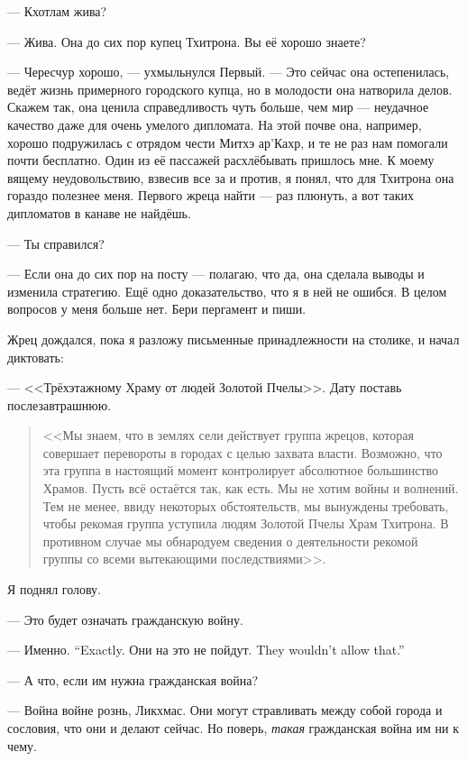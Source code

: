 --- Кхотлам жива?

--- Жива.
Она до сих пор купец Тхитрона.
Вы её хорошо знаете?

--- Чересчур хорошо, --- ухмыльнулся Первый.
--- Это сейчас она остепенилась, ведёт жизнь примерного городского купца, но в молодости она натворила делов.
Скажем так, она ценила справедливость чуть больше, чем мир --- неудачное качество даже для очень умелого дипломата.
На этой почве она, например, хорошо подружилась с отрядом чести Митхэ ар'Кахр, и те не раз нам помогали почти бесплатно.
Один из её пассажей расхлёбывать пришлось мне.
К моему вящему неудовольствию, взвесив все за и против, я понял, что для Тхитрона она гораздо полезнее меня.
Первого жреца найти --- раз плюнуть, а вот таких дипломатов в канаве не найдёшь.

--- Ты справился?

--- Если она до сих пор на посту --- полагаю, что да, она сделала выводы и изменила стратегию.
Ещё одно доказательство, что я в ней не ошибся.
В целом вопросов у меня больше нет.
Бери пергамент и пиши.

Жрец дождался, пока я разложу письменные принадлежности на столике, и начал диктовать:

--- <<Трёхэтажному Храму от людей Золотой Пчелы>>.
Дату поставь послезавтрашнюю.

\begin{quote}
<<Мы знаем, что в землях сели действует группа жрецов, которая совершает перевороты в городах с целью захвата власти.
Возможно, что эта группа в настоящий момент контролирует абсолютное большинство Храмов.
Пусть всё остаётся так, как есть.
Мы не хотим войны и волнений.
Тем не менее, ввиду некоторых обстоятельств, мы вынуждены требовать, чтобы рекомая группа уступила людям Золотой Пчелы Храм Тхитрона.
В противном случае мы обнародуем сведения о деятельности рекомой группы со всеми вытекающими последствиями>>.
\end{quote}

Я поднял голову.

--- Это будет означать гражданскую войну.

{--- Именно.}
{``Exactly.}
{Они на это не пойдут.}
{They wouldn't allow that.''}

--- А что, если им нужна гражданская война?

--- Война войне рознь, Ликхмас.
Они могут стравливать между собой города и сословия, что они и делают сейчас.
Но поверь, \emph{такая} гражданская война им ни к чему.

